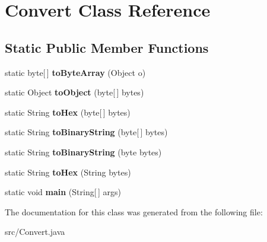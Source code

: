 \hypertarget{class_convert}{\section{Convert Class Reference}
\label{class_convert}
}
\subsection*{Static Public Member Functions}
\begin{DoxyCompactItemize}
\item 
\hypertarget{class_convert_aebce018f64c3710e0f125ba3d5c5b0e7}{static byte\mbox{[}$\,$\mbox{]} {\bfseries to\-Byte\-Array} (Object o)}\label{class_convert_aebce018f64c3710e0f125ba3d5c5b0e7}

\item 
\hypertarget{class_convert_a7f2014d77c433c9097ce93061318d515}{static Object {\bfseries to\-Object} (byte\mbox{[}$\,$\mbox{]} bytes)}\label{class_convert_a7f2014d77c433c9097ce93061318d515}

\item 
\hypertarget{class_convert_aae1b0b913419b9507a83865ecd67864e}{static String {\bfseries to\-Hex} (byte\mbox{[}$\,$\mbox{]} bytes)}\label{class_convert_aae1b0b913419b9507a83865ecd67864e}

\item 
\hypertarget{class_convert_a4e74cdecb76c72ec0cc2e9af812275ab}{static String {\bfseries to\-Binary\-String} (byte\mbox{[}$\,$\mbox{]} bytes)}\label{class_convert_a4e74cdecb76c72ec0cc2e9af812275ab}

\item 
\hypertarget{class_convert_ab26526aaf2b8e31847f9a2d1aa41492a}{static String {\bfseries to\-Binary\-String} (byte bytes)}\label{class_convert_ab26526aaf2b8e31847f9a2d1aa41492a}

\item 
\hypertarget{class_convert_a4024fa392652d521ada3ae32805cc2fb}{static String {\bfseries to\-Hex} (String bytes)}\label{class_convert_a4024fa392652d521ada3ae32805cc2fb}

\item 
\hypertarget{class_convert_af3b7a4f9fe63d11156958117a3f1d246}{static void {\bfseries main} (String\mbox{[}$\,$\mbox{]} args)}\label{class_convert_af3b7a4f9fe63d11156958117a3f1d246}

\end{DoxyCompactItemize}


The documentation for this class was generated from the following file\-:\begin{DoxyCompactItemize}
\item 
src/Convert.\-java\end{DoxyCompactItemize}

